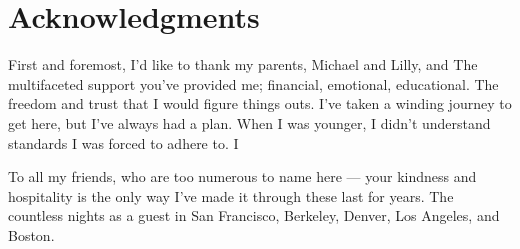 \documentclass[11pt, oneside, openany]{scrbook}
\begin{document}
\newpage
\section*{Acknowledgments}
First and foremost, I'd like to thank my parents, Michael and Lilly, and  The multifaceted support you've provided me; financial, emotional, educational. The freedom and trust that I would figure things outs. I've taken a winding journey to get here, but I've always had a plan. When I was younger, I didn't understand standards I was forced to adhere to. I

To all my friends, who are too numerous to name here --- your kindness and hospitality is the only way I've made it through these last for years. The countless nights as a guest in San Francisco, Berkeley, Denver, Los Angeles, and Boston.



\setcounter{tocdepth}{1}

\tableofcontents

\listoftables

\listoffigures
\mainmatter





\backmatter
\end{document}
